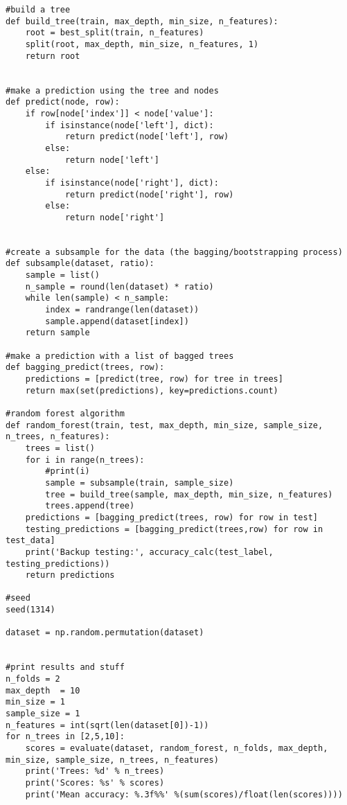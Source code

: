 \begin{lstlisting}
#build a tree
def build_tree(train, max_depth, min_size, n_features):
    root = best_split(train, n_features)
    split(root, max_depth, min_size, n_features, 1)
    return root


#make a prediction using the tree and nodes
def predict(node, row):
    if row[node['index']] < node['value']:
        if isinstance(node['left'], dict):
            return predict(node['left'], row)
        else:
            return node['left']
    else:
        if isinstance(node['right'], dict):
            return predict(node['right'], row)
        else:
            return node['right']


#create a subsample for the data (the bagging/bootstrapping process)
def subsample(dataset, ratio):
    sample = list()
    n_sample = round(len(dataset) * ratio)
    while len(sample) < n_sample:
        index = randrange(len(dataset))
        sample.append(dataset[index])
    return sample

#make a prediction with a list of bagged trees
def bagging_predict(trees, row):
    predictions = [predict(tree, row) for tree in trees]
    return max(set(predictions), key=predictions.count)

#random forest algorithm
def random_forest(train, test, max_depth, min_size, sample_size, n_trees, n_features):
    trees = list()
    for i in range(n_trees):
        #print(i)
        sample = subsample(train, sample_size)
        tree = build_tree(sample, max_depth, min_size, n_features)
        trees.append(tree)
    predictions = [bagging_predict(trees, row) for row in test]
    testing_predictions = [bagging_predict(trees,row) for row in test_data]
    print('Backup testing:', accuracy_calc(test_label, testing_predictions))
    return predictions

#seed
seed(1314)

dataset = np.random.permutation(dataset)


#print results and stuff
n_folds = 2
max_depth  = 10
min_size = 1
sample_size = 1
n_features = int(sqrt(len(dataset[0])-1))
for n_trees in [2,5,10]:
    scores = evaluate(dataset, random_forest, n_folds, max_depth, min_size, sample_size, n_trees, n_features)
    print('Trees: %d' % n_trees)
    print('Scores: %s' % scores)
    print('Mean accuracy: %.3f%%' %(sum(scores)/float(len(scores))))



\end{lstlisting}

